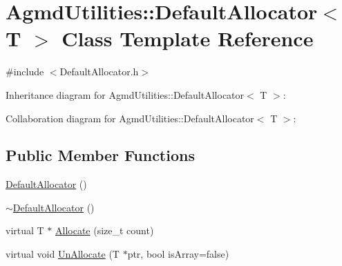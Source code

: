 \hypertarget{class_agmd_utilities_1_1_default_allocator}{\section{Agmd\+Utilities\+:\+:Default\+Allocator$<$ T $>$ Class Template Reference}
\label{class_agmd_utilities_1_1_default_allocator}
}


{\ttfamily \#include $<$Default\+Allocator.\+h$>$}



Inheritance diagram for Agmd\+Utilities\+:\+:Default\+Allocator$<$ T $>$\+:


Collaboration diagram for Agmd\+Utilities\+:\+:Default\+Allocator$<$ T $>$\+:
\subsection*{Public Member Functions}
\begin{DoxyCompactItemize}
\item 
\hyperlink{class_agmd_utilities_1_1_default_allocator_aa1bac5eff38353e8d2bd9237943200d6}{Default\+Allocator} ()
\item 
\hyperlink{class_agmd_utilities_1_1_default_allocator_a3d2e3a34ddb5633cf2f1530b4f4b8ca5}{$\sim$\+Default\+Allocator} ()
\item 
virtual T $\ast$ \hyperlink{class_agmd_utilities_1_1_default_allocator_a041371f1bdf5beb3c035548d1cb0b6b6}{Allocate} (size\+\_\+t count)
\item 
virtual void \hyperlink{class_agmd_utilities_1_1_default_allocator_a213530de9646c3b49e85a6b469ba5e78}{Un\+Allocate} (T $\ast$ptr, bool is\+Array=false)
\end{DoxyCompactItemize}



